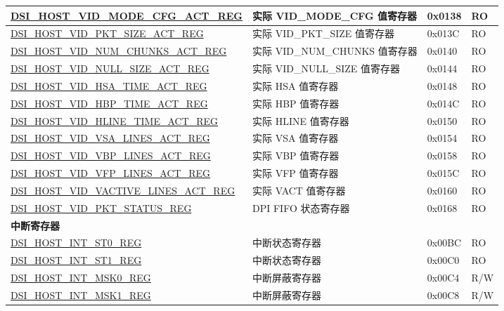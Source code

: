 \begin{longtable}{ | p{6.8cm} | p{6.8cm} | p{1.2cm} | p{1cm} | }
\hyperref[regdesc:DSIHOSTVIDMODECFGACTREG]{DSI\_HOST\_VID\_MODE\_CFG\_ACT\_REG} & 实际 VID\_MODE\_CFG 值寄存器 & 0x0138 & RO \\ \hline
\hyperref[regdesc:DSIHOSTVIDPKTSIZEACTREG]{DSI\_HOST\_VID\_PKT\_SIZE\_ACT\_REG} & 实际 VID\_PKT\_SIZE 值寄存器 & 0x013C & RO \\ \hline
\hyperref[regdesc:DSIHOSTVIDNUMCHUNKSACTREG]{DSI\_HOST\_VID\_NUM\_CHUNKS\_ACT\_REG} & 实际 VID\_NUM\_CHUNKS 值寄存器 & 0x0140 & RO \\ \hline
\hyperref[regdesc:DSIHOSTVIDNULLSIZEACTREG]{DSI\_HOST\_VID\_NULL\_SIZE\_ACT\_REG} & 实际 VID\_NULL\_SIZE 值寄存器 & 0x0144 & RO \\ \hline
\hyperref[regdesc:DSIHOSTVIDHSATIMEACTREG]{DSI\_HOST\_VID\_HSA\_TIME\_ACT\_REG} & 实际 HSA 值寄存器 & 0x0148 & RO \\ \hline
\hyperref[regdesc:DSIHOSTVIDHBPTIMEACTREG]{DSI\_HOST\_VID\_HBP\_TIME\_ACT\_REG} & 实际 HBP 值寄存器 & 0x014C & RO \\ \hline
\hyperref[regdesc:DSIHOSTVIDHLINETIMEACTREG]{DSI\_HOST\_VID\_HLINE\_TIME\_ACT\_REG} & 实际 HLINE 值寄存器 & 0x0150 & RO \\ \hline
\hyperref[regdesc:DSIHOSTVIDVSALINESACTREG]{DSI\_HOST\_VID\_VSA\_LINES\_ACT\_REG} & 实际 VSA 值寄存器 & 0x0154 & RO \\ \hline
\hyperref[regdesc:DSIHOSTVIDVBPLINESACTREG]{DSI\_HOST\_VID\_VBP\_LINES\_ACT\_REG} & 实际 VBP 值寄存器 & 0x0158 & RO \\ \hline
\hyperref[regdesc:DSIHOSTVIDVFPLINESACTREG]{DSI\_HOST\_VID\_VFP\_LINES\_ACT\_REG} & 实际 VFP 值寄存器 & 0x015C & RO \\ \hline
\hyperref[regdesc:DSIHOSTVIDVACTIVELINESACTREG]{DSI\_HOST\_VID\_VACTIVE\_LINES\_ACT\_REG} & 实际 VACT 值寄存器 & 0x0160 & RO \\ \hline
\hyperref[regdesc:DSIHOSTVIDPKTSTATUSREG]{DSI\_HOST\_VID\_PKT\_STATUS\_REG} & DPI FIFO 状态寄存器 & 0x0168 & RO \\ \hline
\multicolumn{4}{|l|}{\textbf{中断寄存器}} \\ \hline
\hyperref[regdesc:DSIHOSTINTST0REG]{DSI\_HOST\_INT\_ST0\_REG} & 中断状态寄存器 & 0x00BC & RO \\ \hline
\hyperref[regdesc:DSIHOSTINTST1REG]{DSI\_HOST\_INT\_ST1\_REG} & 中断状态寄存器 & 0x00C0 & RO \\ \hline
\hyperref[regdesc:DSIHOSTINTMSK0REG]{DSI\_HOST\_INT\_MSK0\_REG} & 中断屏蔽寄存器 & 0x00C4 & R/W \\ \hline
\hyperref[regdesc:DSIHOSTINTMSK1REG]{DSI\_HOST\_INT\_MSK1\_REG} & 中断屏蔽寄存器 & 0x00C8 & R/W \\ \hline
\end{longtable}
